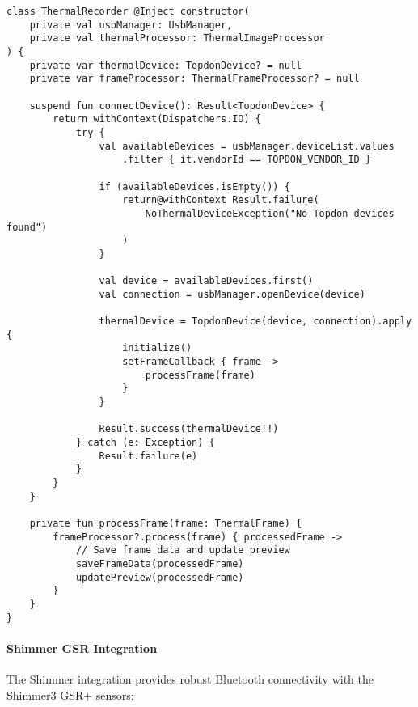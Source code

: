 \documentclass[12pt,a4paper]{article}
\begin{document}
\begin{verbatim}
class ThermalRecorder @Inject constructor(
    private val usbManager: UsbManager,
    private val thermalProcessor: ThermalImageProcessor
) {
    private var thermalDevice: TopdonDevice? = null
    private var frameProcessor: ThermalFrameProcessor? = null

    suspend fun connectDevice(): Result<TopdonDevice> {
        return withContext(Dispatchers.IO) {
            try {
                val availableDevices = usbManager.deviceList.values
                    .filter { it.vendorId == TOPDON_VENDOR_ID }

                if (availableDevices.isEmpty()) {
                    return@withContext Result.failure(
                        NoThermalDeviceException("No Topdon devices found")
                    )
                }

                val device = availableDevices.first()
                val connection = usbManager.openDevice(device)

                thermalDevice = TopdonDevice(device, connection).apply {
                    initialize()
                    setFrameCallback { frame ->
                        processFrame(frame)
                    }
                }

                Result.success(thermalDevice!!)
            } catch (e: Exception) {
                Result.failure(e)
            }
        }
    }

    private fun processFrame(frame: ThermalFrame) {
        frameProcessor?.process(frame) { processedFrame ->
            // Save frame data and update preview
            saveFrameData(processedFrame)
            updatePreview(processedFrame)
        }
    }
}
\end{verbatim}

\paragraph{Shimmer GSR Integration}

The Shimmer integration provides robust Bluetooth connectivity with the Shimmer3 GSR+ sensors:
\end{document}
